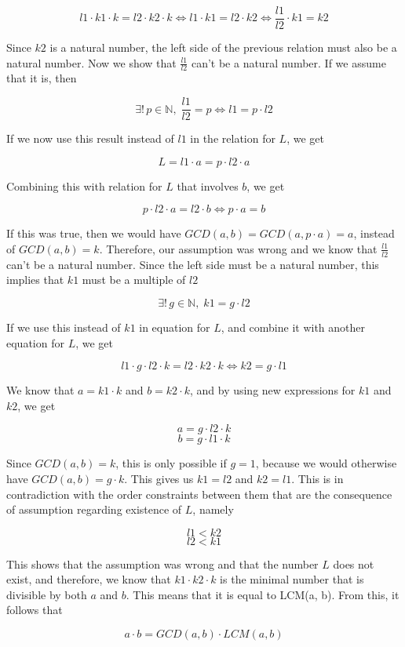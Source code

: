 \documentclass{article}
\begin{document}
\[ l1 \cdot k1 \cdot k = l2 \cdot k2 \cdot k \iff l1 \cdot k1 = l2 \cdot k2 \iff \frac{l1}{l2} \cdot k1 = k2 \]

Since $k2$ is a natural number, the left side of the previous relation must also be a natural number. Now we show that $\frac{l1}{l2}$ can't be a natural number. If we assume that it is, then

\[ \exists! \, p \in \mathbb{N} , \; \frac{l1}{l2} = p \iff l1 = p \cdot l2 \]

If we now use this result instead of $l1$ in the relation for $L$, we get

\[ L = l1 \cdot a = p \cdot l2 \cdot a \]

Combining this with relation for $L$ that involves $b$, we get

\[ p \cdot l2 \cdot a = l2 \cdot b \iff p \cdot a = b \]

If this was true, then we would have $GCD(a, b) = GCD(a, p \cdot a) = a$, instead of $GCD(a, b) = k$. Therefore, our assumption was wrong and we know that $\frac{l1}{l2}$ can't be a natural number. Since the left side must be a natural number, this implies that $k1$ must be a multiple of $l2$

\[ \exists! \, g \in \mathbb{N}, \; k1 = g \cdot l2 \]

If we use this instead of $k1$ in equation for $L$, and combine it with another equation for $L$, we get

\[ l1 \cdot g \cdot l2 \cdot k = l2 \cdot k2 \cdot k \iff k2 = g \cdot l1 \]

We know that $a = k1 \cdot k$ and $b = k2 \cdot k$, and by using new expressions for $k1$ and $k2$, we get

\[ a = g \cdot l2 \cdot k \]
\[ b = g \cdot l1 \cdot k \]

Since $GCD(a, b) = k$, this is only possible if $g = 1$, because we would otherwise have $GCD(a, b) = g \cdot k$. This gives us $k1 = l2$ and $k2 = l1$. This is in contradiction with the order constraints between them that are the consequence of assumption regarding existence of $L$, namely

\[ l1 < k2 \]
\[ l2 < k1 \]

This shows that the assumption was wrong and that the number $L$ does not exist, and therefore, we know that $k1 \cdot k2 \cdot k$ is the minimal number that is divisible by both $a$ and $b$. This means that it is equal to LCM(a, b). From this, it follows that

\[ a \cdot b = GCD(a, b) \cdot LCM(a, b) \]

\rightline{$\blacksquare$}
\end{document}
